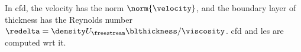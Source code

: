 \documentclass{article}
\begin{document}
In \gls{cfd}, the velocity \velocity{} has the norm $\norm{\velocity}$, and the boundary layer
of thickness \blthickness{} has the Reynolds number $\redelta = \density U_{\freestream}
\blthickness / \viscosity$. \Gls{cfd} and \gls{les} are computed \gls{wrt} it.

\notationglossaries
\end{document}
